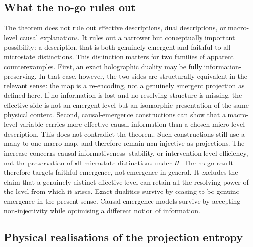\documentclass[12pt,a4paper]{article}
\begin{document}
  \subsection{What the no-go rules out}
  \label{subsec:rulesout}

  The theorem does not rule out effective descriptions, dual descriptions, or macro-level
  causal explanations.
  It rules out a narrower but conceptually important possibility: a description that is both
  genuinely emergent and faithful to all microstate distinctions.
  This distinction matters for two families of apparent counterexamples.
  First, an exact holographic duality may be fully information-preserving.
  In that case, however, the two sides are structurally equivalent in the relevant sense:
  the map is a re-encoding, not a genuinely emergent projection as defined here.
  If no information is lost and no resolving structure is missing, the effective side is not an
  emergent level but an isomorphic presentation of the same physical content.
  Second, causal-emergence constructions can show that a macro-level variable carries more
  effective causal information than a chosen micro-level description.
  This does not contradict the theorem.
  Such constructions still use a many-to-one macro-map, and therefore remain non-injective
  as projections.
  The increase concerns causal informativeness, stability, or intervention-level efficiency,
  not the preservation of all microstate distinctions under $\Pi$.
  The no-go result therefore targets faithful emergence, not emergence in general.
  It excludes the claim that a genuinely distinct effective level can retain all the resolving
  power of the level from which it arises.
  Exact dualities survive by ceasing to be genuine emergence in the present sense.
  Causal-emergence models survive by accepting non-injectivity while optimising a different
  notion of information.

  \subsection{Physical realisations of the projection entropy}
  \label{subsec:realisations}
\end{document}
